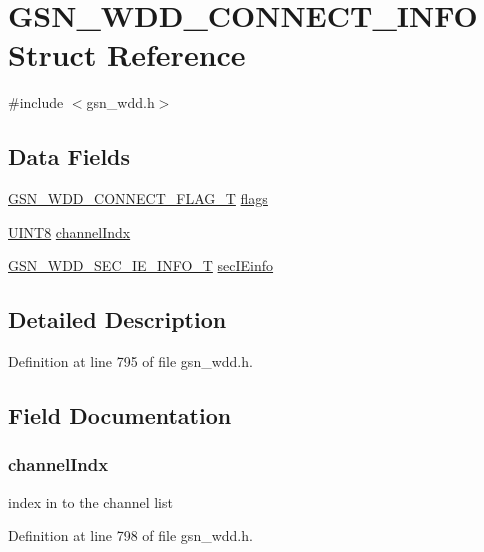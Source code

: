 \hypertarget{a00273}{
\section{GSN\_\-WDD\_\-CONNECT\_\-INFO Struct Reference}
\label{a00273}
}


{\ttfamily \#include $<$gsn\_\-wdd.h$>$}

\subsection*{Data Fields}
\begin{DoxyCompactItemize}
\item 
\hyperlink{a00677_ga3a599f8d47bbbf9108f9156cddf9bd4b}{GSN\_\-WDD\_\-CONNECT\_\-FLAG\_\-T} \hyperlink{a00273_a840dc184661c79f2e8731798ea9aea03}{flags}
\item 
\hyperlink{a00660_gab27e9918b538ce9d8ca692479b375b6a}{UINT8} \hyperlink{a00273_aa68db67be53633590704b8aa1d807dbe}{channelIndx}
\item 
\hyperlink{a00292}{GSN\_\-WDD\_\-SEC\_\-IE\_\-INFO\_\-T} \hyperlink{a00273_ad69e2cfc109b18b97d32417ce1ad2dd7}{secIEinfo}
\end{DoxyCompactItemize}


\subsection{Detailed Description}


Definition at line 795 of file gsn\_\-wdd.h.



\subsection{Field Documentation}
\hypertarget{a00273_aa68db67be53633590704b8aa1d807dbe}{
\subsubsection[{channelIndx}]{ {\bf channelIndx}}}
\label{a00273_aa68db67be53633590704b8aa1d807dbe}
index in to the channel list 

Definition at line 798 of file gsn\_\-wdd.h.

